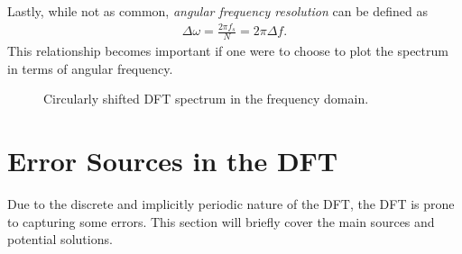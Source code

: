 \documentclass{report}
\begin{document}
Lastly, while not as common, \emph{angular frequency resolution} can be defined as 
\begin{align}
    \Delta \omega = \frac{2\pi f_s}{N} = 2\pi\Delta f.
\end{align}
This relationship becomes important if one were to choose to plot the spectrum in terms of angular frequency.
\begin{figure}[!hbt]
    \centering
    \caption{Circularly shifted DFT spectrum in the frequency domain.}
    \label{dft_spec_shift}
\end{figure}

\pagebreak
\section{Error Sources in the DFT}
Due to the discrete and implicitly periodic nature of the DFT, the DFT is prone to capturing some errors. This section will briefly cover the main sources and potential solutions.
\end{document}
